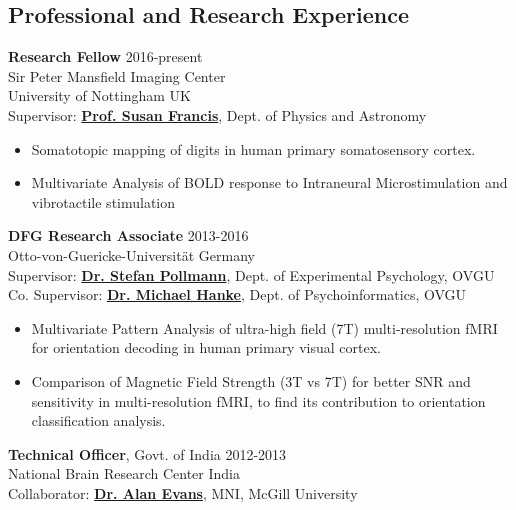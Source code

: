 \documentclass[line, margin]{res}
\begin{document}
\begin{resume}
\section{Professional and Research Experience}

\textbf{Research Fellow} \hfill 2016-present\\
Sir Peter Mansfield Imaging Center\\
University of Nottingham \hfill UK\\
Supervisor: \href{https://www.nottingham.ac.uk/physics/people/susan.francis}{\textbf{Prof. Susan Francis}}, Dept. of Physics and Astronomy\\

\begin{itemize}
    \item Somatotopic mapping of digits in human primary somatosensory cortex. 
    \item Multivariate Analysis of BOLD response to Intraneural Microstimulation and vibrotactile stimulation
\end{itemize}

\textbf{DFG Research Associate} \hfill 2013-2016\\
Otto-von-Guericke-Universit\"{a}t \hfill Germany\\
Supervisor: \href{http://www.ipsy.ovgu.de/ipsy/en/Departments/Experimental+Psychology/People.html}{\textbf{Dr. Stefan Pollmann}}, Dept. of Experimental Psychology, OVGU\\
Co. Supervisor: \href{http://mih.voxindeserto.de/}{\textbf{Dr. Michael Hanke}}, Dept. of Psychoinformatics, OVGU

\begin{itemize}
    \item Multivariate Pattern Analysis of ultra-high field (7T) multi-resolution fMRI for orientation decoding in human primary visual cortex. 
    \item Comparison of Magnetic Field Strength (3T vs 7T) for better SNR and sensitivity in multi-resolution fMRI, to find its contribution to orientation classification analysis.
\end{itemize}


\textbf{Technical Officer}, Govt. of India \hfill 2012-2013\\
National Brain Research Center \hfill India\\
Collaborator: \href{http://mcin-cnim.ca/people/alans-cv/}{\textbf{Dr. Alan Evans}}, MNI, McGill University 
\begin{itemize}


\end{itemize}
\end{resume}
\end{document}
